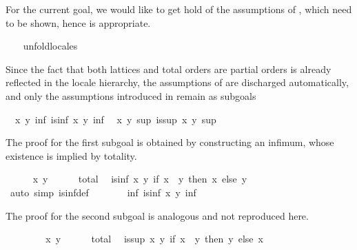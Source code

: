 \begin{isabellebody}
\begin{isamarkuptxt}
  For the current goal, we would like to get hold of
  the assumptions of , which need to be shown, hence
   is appropriate.%
\end{isamarkuptxt}%
\isamarkuptrue%
\ \ \isamarkupfalse%
\ unfold{\isacharunderscore}locales%
\begin{isamarkuptxt}%
\normalsize
  Since the fact that both lattices and total orders are partial
  orders is already reflected in the locale hierarchy, the assumptions
  of  are discharged automatically, and only the
  assumptions introduced in  remain as subgoals
  \begin{isabelle}%
\ {}{\isachardot}\ {\isasymAnd}x\ y{\isachardot}\ {\isasymexists}inf{\isachardot}\ is{\isacharunderscore}inf\ x\ y\ inf\isanewline
\ {}{\isachardot}\ {\isasymAnd}x\ y{\isachardot}\ {\isasymexists}sup{\isachardot}\ is{\isacharunderscore}sup\ x\ y\ sup%
\end{isabelle}
  The proof for the first subgoal is obtained by constructing an
  infimum, whose existence is implied by totality.%
\end{isamarkuptxt}%
\isamarkuptrue%
\ \ \ \ \isamarkupfalse%
\ x\ y\isanewline
\ \ \ \ \isamarkupfalse%
\ total\ \isamarkupfalse%
\ {\isachardoublequoteopen}is{\isacharunderscore}inf\ x\ y\ {\isacharparenleft}if\ x\ {\isasymsqsubseteq}\ y\ then\ x\ else\ y{\isacharparenright}{\isachardoublequoteclose}\isanewline
\ \ \ \ \ \ \isamarkupfalse%
\ {\isacharparenleft}auto\ simp{\isacharcolon}\ is{\isacharunderscore}inf{\isacharunderscore}def{\isacharparenright}\isanewline
\ \ \ \ \isamarkupfalse%
\ \isamarkupfalse%
\ {\isachardoublequoteopen}{\isasymexists}inf{\isachardot}\ is{\isacharunderscore}inf\ x\ y\ inf{\isachardoublequoteclose}\ \isacommand{{\isachardot}{\isachardot}}\isamarkupfalse%
%
\begin{isamarkuptxt}%
\normalsize
   The proof for the second subgoal is analogous and not
  reproduced here.%
\end{isamarkuptxt}%
\isamarkuptrue%
%
\endisatagvisible
{\isafoldvisible}%
%
\isadelimvisible
%
\endisadelimvisible
%
\isadeliminvisible
\ \ %
\endisadeliminvisible
%
\isataginvisible
{}\isamarkupfalse%
\isanewline
\ \ \ \ \isamarkupfalse%
\ x\ y\isanewline
\ \ \ \ \isamarkupfalse%
\ total\ \isamarkupfalse%
\ {\isachardoublequoteopen}is{\isacharunderscore}sup\ x\ y\ {\isacharparenleft}if\ x\ {\isasymsqsubseteq}\ y\ then\ y\ else\ x{\isacharparenright}{\isachardoublequoteclose}\isanewline

\end{isabellebody}
